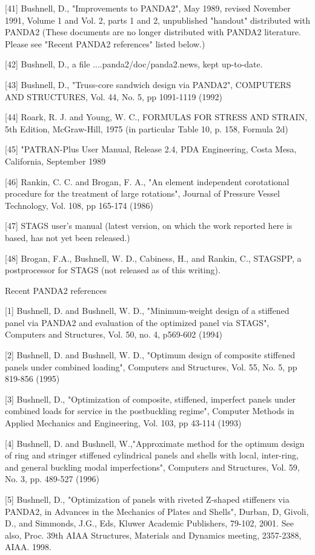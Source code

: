 [41] Bushnell, D., "Improvements to PANDA2", May 1989, revised November
1991, Volume 1 and Vol. 2, parts 1 and 2, unpublished "handout"
distributed with PANDA2
(These documents are no longer distributed with PANDA2 literature. Please
see "Recent PANDA2 references" listed below.) 

[42] Bushnell, D., a file ....panda2/doc/panda2.news, kept up-to-date.

[43] Bushnell, D., "Truss-core sandwich design via PANDA2", 
COMPUTERS AND STRUCTURES, Vol. 44, No. 5, pp 1091-1119 (1992)

[44] Roark, R. J. and Young, W. C., FORMULAS FOR STRESS AND STRAIN,
5th Edition, McGraw-Hill, 1975 (in particular Table 10, p. 158,
Formula 2d) 

[45] "PATRAN-Plus User Manual, Release 2.4, PDA Engineering, Costa Mesa,
California, September 1989

[46] Rankin, C. C. and Brogan, F. A., "An element independent corotational
procedure for the treatment of large rotations", Journal of Pressure
Vessel Technology, Vol. 108, pp 165-174 (1986)

[47] STAGS user's manual (latest version, on which the work reported here
is based, has not yet been released.)

[48] Brogan, F.A., Bushnell, W. D., Cabiness, H., and Rankin, C., STAGSPP,
a postprocessor for STAGS (not released as of this writing).


                       Recent PANDA2 references

[1] Bushnell, D. and Bushnell, W. D., "Minimum-weight design of a
stiffened panel via PANDA2 and evaluation of the optimized panel via
STAGS", Computers and Structures, Vol. 50, no. 4, p569-602 (1994)

[2] Bushnell, D. and Bushnell, W. D., "Optimum design of composite
stiffened panels under combined loading", Computers and Structures,
Vol. 55, No. 5, pp 819-856 (1995)

[3] Bushnell, D., "Optimization of composite, stiffened, imperfect
panels under combined loads for service in the postbuckling regime",
Computer Methods in Applied Mechanics and Engineering, Vol. 103, pp
43-114 (1993) 

[4] Bushnell, D. and Bushnell, W.,"Approximate method for the optimum
design of ring and stringer stiffened cylindrical panels and shells
with local, inter-ring, and general buckling modal imperfections", 
Computers and Structures, Vol. 59, No. 3, pp. 489-527 (1996)

[5] Bushnell, D., "Optimization of panels with riveted Z-shaped
          stiffeners via PANDA2, in Advances in the Mechanics of Plates and
          Shells", Durban, D, Givoli, D., and Simmonds, J.G., Eds, Kluwer
          Academic Publishers,  79-102, 2001. See also,  Proc. 39th AIAA
          Structures, Materials and Dynamics meeting, 2357-2388, AIAA. 1998. 

